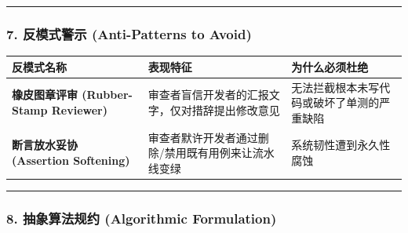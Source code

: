 \begin{center}\rule{0.5\linewidth}{0.5pt}\end{center}

\subsubsection{7. 反模式警示 (Anti-Patterns to
Avoid)}\label{ux53cdux6a21ux5f0fux8b66ux793a-anti-patterns-to-avoid-1}

{\def\LTcaptype{} %
\begin{longtable}[]{@{}
  >{\raggedright\arraybackslash}p{}
  >{\raggedright\arraybackslash}p{}
  >{\raggedright\arraybackslash}p{}@{}}
\toprule\noalign{}
\begin{minipage}[b]{\linewidth}\raggedright
反模式名称
\end{minipage} & \begin{minipage}[b]{\linewidth}\raggedright
表现特征
\end{minipage} & \begin{minipage}[b]{\linewidth}\raggedright
为什么必须杜绝
\end{minipage} \\
\midrule\noalign{}
\endhead
\bottomrule\noalign{}
\endlastfoot
\textbf{橡皮图章评审 (Rubber-Stamp Reviewer)} &
审查者盲信开发者的汇报文字，仅对措辞提出修改意见 &
无法拦截根本未写代码或破坏了单测的严重缺陷 \\
\textbf{断言放水妥协 (Assertion Softening)} &
审查者默许开发者通过删除/禁用既有用例来让流水线变绿 &
系统韧性遭到永久性腐蚀 \\
\end{longtable}
}

\begin{center}\rule{0.5\linewidth}{0.5pt}\end{center}

\subsubsection{8. 抽象算法规约 (Algorithmic
Formulation)}\label{ux62bdux8c61ux7b97ux6cd5ux89c4ux7ea6-algorithmic-formulation-1}


